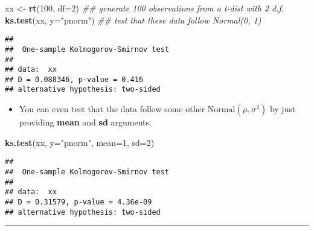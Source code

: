 \documentclass[]{book}
\newenvironment{Shaded}{\begin{snugshade}}{\end{snugshade}}
\newcommand{\CommentTok}[1]{\textcolor[rgb]{0.56,0.35,0.01}{\textit{#1}}}
\newcommand{\DataTypeTok}[1]{\textcolor[rgb]{0.13,0.29,0.53}{#1}}
\newcommand{\DecValTok}[1]{\textcolor[rgb]{0.00,0.00,0.81}{#1}}
\newcommand{\KeywordTok}[1]{\textcolor[rgb]{0.13,0.29,0.53}{\textbf{#1}}}
\newcommand{\NormalTok}[1]{#1}
\newcommand{\StringTok}[1]{\textcolor[rgb]{0.31,0.60,0.02}{#1}}
\providecommand{\tightlist}{%
  \setlength{\itemsep}{0pt}\setlength{\parskip}{0pt}}
\begin{document}
\begin{Shaded}
\begin{Highlighting}[]
\NormalTok{xx <-}\StringTok{ }\KeywordTok{rt}\NormalTok{(}\DecValTok{100}\NormalTok{, }\DataTypeTok{df=}\DecValTok{2}\NormalTok{) }\CommentTok{## generate 100 observations from a t-dist with 2 d.f.}
\KeywordTok{ks.test}\NormalTok{(xx, }\DataTypeTok{y=}\StringTok{"pnorm"}\NormalTok{)  }\CommentTok{## test that these data follow Normal(0, 1)}
\end{Highlighting}
\end{Shaded}

\begin{verbatim}
## 
##  One-sample Kolmogorov-Smirnov test
## 
## data:  xx
## D = 0.088346, p-value = 0.416
## alternative hypothesis: two-sided
\end{verbatim}

\begin{itemize}
\tightlist
\item
  You can even test that the data follow some other \(\textrm{Normal}(\mu, \sigma^{2})\)
  by just providing \textbf{mean} and \textbf{sd} arguments.
\end{itemize}

\begin{Shaded}
\begin{Highlighting}[]
\KeywordTok{ks.test}\NormalTok{(xx, }\DataTypeTok{y=}\StringTok{"pnorm"}\NormalTok{, }\DataTypeTok{mean=}\DecValTok{1}\NormalTok{, }\DataTypeTok{sd=}\DecValTok{2}\NormalTok{)  }
\end{Highlighting}
\end{Shaded}

\begin{verbatim}
## 
##  One-sample Kolmogorov-Smirnov test
## 
## data:  xx
## D = 0.31579, p-value = 4.36e-09
## alternative hypothesis: two-sided
\end{verbatim}

\begin{center}\rule{0.5\linewidth}{\linethickness}\end{center}
\end{document}

